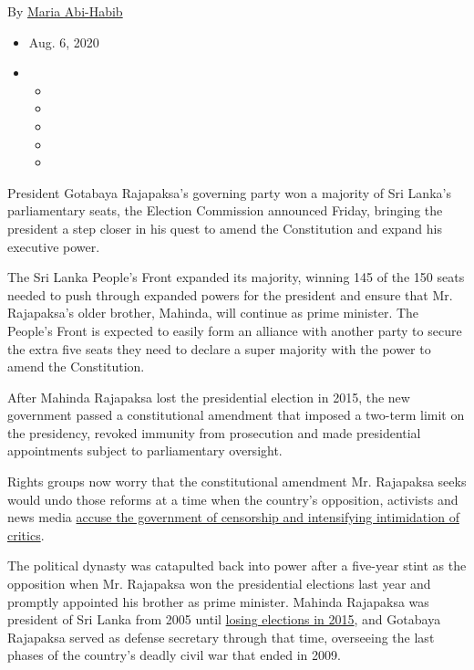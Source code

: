 By \href{https://www.nytimes3xbfgragh.onion/by/maria-abi-habib}{Maria
Abi-Habib}

\begin{itemize}
\item
  Aug. 6, 2020
\item
  \begin{itemize}
  \item
  \item
  \item
  \item
  \item
  \end{itemize}
\end{itemize}

President Gotabaya Rajapaksa's governing party won a majority of Sri
Lanka's parliamentary seats, the Election Commission announced Friday,
bringing the president a step closer in his quest to amend the
Constitution and expand his executive power.

The Sri Lanka People's Front expanded its majority, winning 145 of the
150 seats needed to push through expanded powers for the president and
ensure that Mr. Rajapaksa's older brother, Mahinda, will continue as
prime minister. The People's Front is expected to easily form an
alliance with another party to secure the extra five seats they need to
declare a super majority with the power to amend the Constitution.

After Mahinda Rajapaksa lost the presidential election in 2015, the new
government passed a constitutional amendment that imposed a two-term
limit on the presidency, revoked immunity from prosecution and made
presidential appointments subject to parliamentary oversight.

Rights groups now worry that the constitutional amendment Mr. Rajapaksa
seeks would undo those reforms at a time when the country's opposition,
activists and news media
\href{https://www.nytimes3xbfgragh.onion/2019/11/27/world/asia/sri-lanka-rajapaksa-crackdown.html}{accuse
the government of censorship and intensifying intimidation of critics}.

The political dynasty was catapulted back into power after a five-year
stint as the opposition when Mr. Rajapaksa won the presidential
elections last year and promptly appointed his brother as prime
minister. Mahinda Rajapaksa was president of Sri Lanka from 2005 until
\href{https://www.nytimes3xbfgragh.onion/2015/01/09/world/asia/sri-lanka-election-president-mahinda-rajapaksa.html}{losing
elections in 2015}, and Gotabaya Rajapaksa served as defense secretary
through that time, overseeing the last phases of the country's deadly
civil war that ended in 2009.

